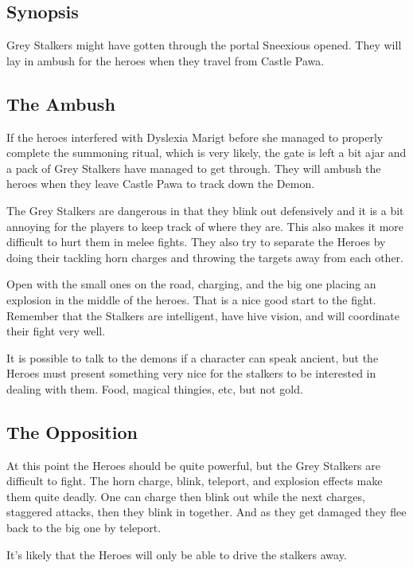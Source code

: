 \subsection*{Synopsis}
Grey Stalkers might have gotten through the portal Sneexious opened. They will lay in ambush for the heroes when they travel from Castle Pawa.


\subsection*{The Ambush}
If the heroes interfered with Dyslexia Marigt before she managed to properly complete the summoning ritual, which is very likely, the gate is left a bit ajar and a pack of Grey Stalkers have managed to get through. They will ambush the heroes when they leave Castle Pawa to track down the Demon.

The Grey Stalkers are dangerous in that they blink out defensively and it is a bit annoying for the players to keep track of where they are. This also makes it more difficult to hurt them in melee fights. They also try to separate the Heroes by doing their tackling horn charges and throwing the targets away from each other.

Open with the small ones on the road, charging, and the big one placing an explosion in the middle of the heroes. That is a nice good start to the fight. Remember that the Stalkers are intelligent, have hive vision, and will coordinate their fight very well.

It is possible to talk to the demons if a character can speak ancient, but the Heroes must present something very nice for the stalkers to be interested in dealing with them. Food, magical thingies, etc, but not gold.


\subsection*{The Opposition}
At this point the Heroes should be quite powerful, but the Grey Stalkers are difficult to fight. The horn charge, blink, teleport, and explosion effects make them quite deadly. One can charge then blink out while the next charges, staggered attacks, then they blink in together. And as they get damaged they flee back to the big one by teleport.

It's likely that the Heroes will only be able to drive the stalkers away.

\

